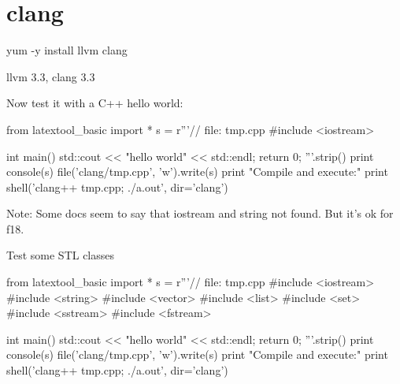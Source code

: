 \section{clang}

\begin{console}
yum -y install llvm clang  
\end{console}
llvm 3.3, clang 3.3

Now test it with a C++ hello world:
\begin{python}
from latextool_basic import *
s = r'''// file: tmp.cpp
#include <iostream>

int main()
{
    std::cout << "hello world" << std::endl;
    return 0;
}
'''.strip()
print console(s)
file('clang/tmp.cpp', 'w').write(s)
print "Compile and execute:"
print shell('clang++ tmp.cpp; ./a.out', dir='clang')
\end{python}

Note: Some docs seem to say that iostream and string not found.
But it's ok for f18.

Test some STL classes
\begin{python}
from latextool_basic import *
s = r'''// file: tmp.cpp
#include <iostream>
#include <string>
#include <vector>
#include <list>
#include <set>
#include <sstream>
#include <fstream>

int main()
{
    std::cout << "hello world" << std::endl;
    return 0;
}
'''.strip()
print console(s)
file('clang/tmp.cpp', 'w').write(s)
print "Compile and execute:"
print shell('clang++ tmp.cpp; ./a.out', dir='clang')
\end{python}

